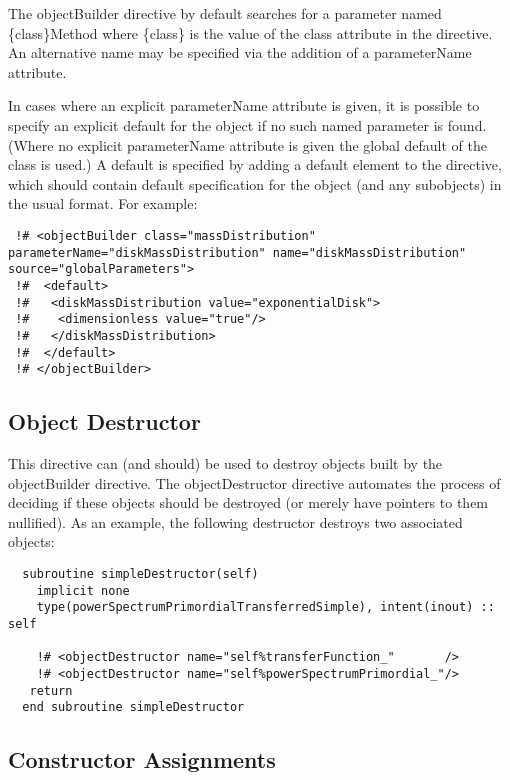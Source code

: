 The {\normalfont \ttfamily objectBuilder} directive by default searches for a parameter named {\normalfont \ttfamily \{class\}Method} where {\normalfont \ttfamily \{class\}} is the value of the {\normalfont \ttfamily class} attribute in the directive. An alternative name may be specified via the addition of a {\normalfont \ttfamily parameterName} attribute.

In cases where an explicit {\normalfont \ttfamily parameterName} attribute is given, it is possible to specify an explicit default for the object if no such named parameter is found. (Where no explicit {\normalfont \ttfamily parameterName} attribute is given the global default of the class is used.) A default is specified by adding a {\normalfont \ttfamily default} element to the directive, which should contain default specification for the object (and any subobjects) in the usual format. For example:
\begin{verbatim}
 !# <objectBuilder class="massDistribution" parameterName="diskMassDistribution" name="diskMassDistribution" source="globalParameters">
 !#  <default>
 !#   <diskMassDistribution value="exponentialDisk">
 !#    <dimensionless value="true"/>
 !#   </diskMassDistribution>
 !#  </default>
 !# </objectBuilder>
\end{verbatim}

\subsection{Object Destructor}

This directive can (and should) be used to destroy objects built by the {\normalfont \ttfamily objectBuilder} directive. The {\normalfont \ttfamily objectDestructor} directive automates the process of deciding if these objects should be destroyed (or merely have pointers to them nullified). As an example, the following destructor destroys two associated objects:
\begin{lstlisting}  
  subroutine simpleDestructor(self)
    implicit none
    type(powerSpectrumPrimordialTransferredSimple), intent(inout) :: self

    !# <objectDestructor name="self%transferFunction_"       />
    !# <objectDestructor name="self%powerSpectrumPrimordial_"/>
   return
  end subroutine simpleDestructor
\end{lstlisting}

\subsection{Constructor Assignments}

